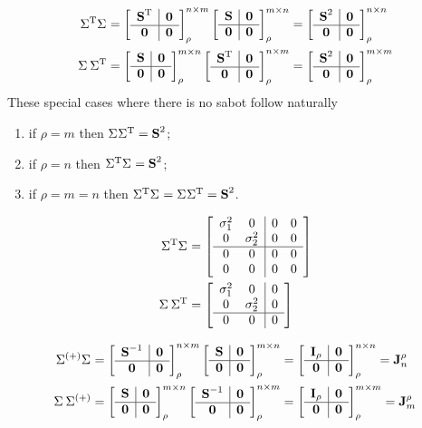 \begin{equation}
  \begin{split}
  \sig{T}\sig{} &= 
  \mat{c|c}{\textbf{S}^{\mathrm{T}} & \zero \\\hline \zero & \zero}^{\by{n}{m}}_{\rho} 
  \mat{c|c}{\textbf{S} & \zero \\\hline \zero & \zero}^{\by{m}{n}}_{\rho} = 
  \mat{c|c}{\textbf{S}^{2} & \zero \\\hline \zero & \zero}^{\by{n}{n}}_{\rho} \\
  \sig{}\,\sig{T} &= 
  \mat{c|c}{\textbf{S} & \zero \\\hline \zero & \zero}^{\by{m}{n}}_{\rho} 
  \mat{c|c}{\textbf{S}^{\mathrm{T}} & \zero \\\hline \zero & \zero}^{\by{n}{m}}_{\rho} = 
  \mat{c|c}{\textbf{S}^{2} & \zero \\\hline \zero & \zero}^{\by{m}{m}}_{\rho}
  \end{split}
\end{equation}
These special cases where there is no sabot follow naturally
\begin{enumerate}
\item if $\rho=m$ then $\sig{}\sig{T} = \ess{2}$;
\item if $\rho=n$ then $\sig{T}\sig{} = \ess{2}$;
\item if $\rho=m=n$ then $\sig{T}\sig{} = \sig{}\sig{T} = \ess{2}$.
\end{enumerate}

\begin{equation}
  \begin{split}
  \sig{T}\sig{} &= \mat{cc|cc}{\sigma_{1}^{2}&0&0&0\\0&\sigma_{2}^{2}&0&0\\\hline0&0&0&0\\0&0&0&0} \\
  \sig{}\,\sig{T} &= \mat{cc|c}{\sigma_{1}^{2}&0&0\\0&\sigma_{2}^{2}&0\\\hline0&0&0}
  \end{split}
\end{equation}


\begin{equation}
  \begin{split}
  \sig{(+)}\sig{} &= 
  \mat{c|c}{\textbf{S}^{-1} & \zero \\\hline \zero & \zero}^{\by{n}{m}}_{\rho} 
  \mat{c|c}{\textbf{S} & \zero \\\hline \zero & \zero}^{\by{m}{n}}_{\rho} = 
  \mat{c|c}{\I{\rho} & \zero \\\hline \zero & \zero}^{\by{n}{n}}_{\rho}=\J{n}{\rho} \\
  \sig{}\,\sig{(+)} &= 
  \mat{c|c}{\textbf{S} & \zero \\\hline \zero & \zero}^{\by{m}{n}}_{\rho} 
  \mat{c|c}{\textbf{S}^{-1} & \zero \\\hline \zero & \zero}^{\by{n}{m}}_{\rho} = 
  \mat{c|c}{\I{\rho} & \zero \\\hline \zero & \zero}^{\by{m}{m}}_{\rho}=\J{m}{\rho}
  \end{split}
\end{equation}

